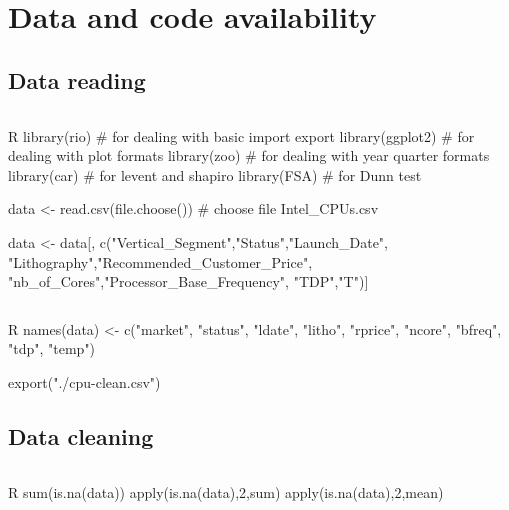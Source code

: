 \section{Data and code availability}
\subsection{Data reading}


\hypertarget{Listing 1}{}
\begin{lstlisting}[language=R, caption=Importing and including package]
\end{lstlisting}
\begin{code}{R}
library(rio)     # for dealing with basic import export
library(ggplot2) # for dealing with plot formats
library(zoo)      # for dealing with year quarter formats
library(car)     # for levent and shapiro
library(FSA)     # for Dunn test

data <- read.csv(file.choose()) # choose file Intel_CPUs.csv

data <- data[, c("Vertical_Segment","Status","Launch_Date",
                 "Lithography","Recommended_Customer_Price",
                 "nb_of_Cores","Processor_Base_Frequency",
                 "TDP","T")] 
\end{code}


\hypertarget{Listing 2}{}
\begin{lstlisting}[language=R, caption=Exporting code]
\end{lstlisting}
\begin{code}{R}
names(data) <- c("market", "status", "ldate", "litho", 
    "rprice", "ncore", "bfreq", "tdp", 
    "temp")

export("./cpu-clean.csv")
\end{code}


\subsection{Data cleaning}

\hypertarget{Listing 3}{}
\begin{lstlisting}[language=R, caption=Importing and including package]
\end{lstlisting}
\begin{code}{R}
sum(is.na(data))
apply(is.na(data),2,sum)
apply(is.na(data),2,mean)
\end{code}

